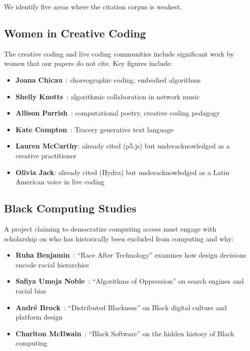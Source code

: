 \documentclass[10pt,letterpaper,twocolumn]{article}
\begin{document}
We identify five areas where the citation corpus is weakest.

\subsection{Women in Creative Coding}

The creative coding and live coding communities include significant work by women that our papers do not cite. Key figures include:

\begin{itemize}
  \item \textbf{Joana Chicau}~\citep{chicau2021choreo}: choreographic coding, embodied algorithms
  \item \textbf{Shelly Knotts}~\citep{knotts2015algorithmic}: algorithmic collaboration in network music
  \item \textbf{Allison Parrish}~\citep{parrish2015programming}: computational poetry, creative coding pedagogy
  \item \textbf{Kate Compton}~\citep{compton2015tracery}: Tracery generative text language
  \item \textbf{Lauren McCarthy}: already cited (p5.js) but underacknowledged as a creative practitioner
  \item \textbf{Olivia Jack}: already cited (Hydra) but underacknowledged as a Latin American voice in live coding
\end{itemize}

\subsection{Black Computing Studies}

A project claiming to democratize computing access must engage with scholarship on who has historically been excluded from computing and why:

\begin{itemize}
  \item \textbf{Ruha Benjamin}~\citep{benjamin2019race}: ``Race After Technology'' examines how design decisions encode racial hierarchies
  \item \textbf{Safiya Umoja Noble}~\citep{noble2018algorithms}: ``Algorithms of Oppression'' on search engines and racial bias
  \item \textbf{Andr\'e Brock}~\citep{brock2020distributed}: ``Distributed Blackness'' on Black digital culture and platform design
  \item \textbf{Charlton McIlwain}~\citep{mcilwain2019black}: ``Black Software'' on the hidden history of Black computing
\end{itemize}
\end{document}
